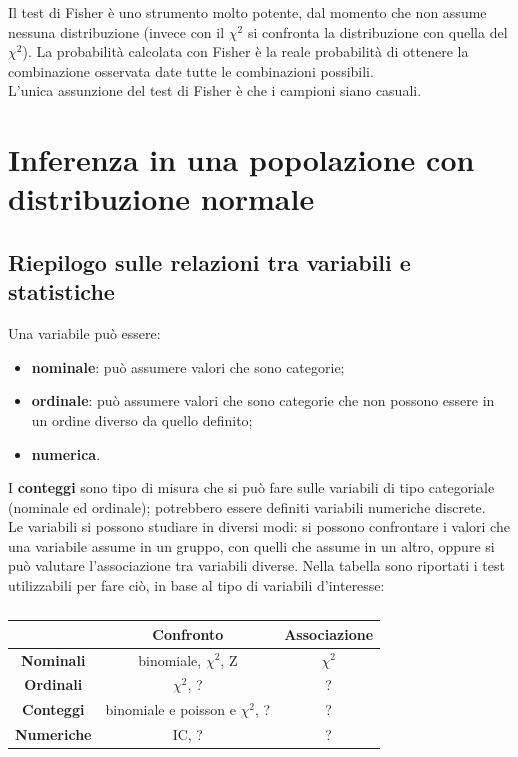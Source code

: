\documentclass[10pt, draft]{book}
\begin{document}
Il test di Fisher è uno strumento molto potente, dal momento che non assume nessuna distribuzione (invece con il $\chi^2$ si confronta la distribuzione con quella del $\chi^2$). La probabilità calcolata con Fisher è la reale probabilità di ottenere la combinazione osservata date tutte le combinazioni possibili.
\\
L'unica assunzione del test di Fisher è che i campioni siano casuali.

\chapter{Inferenza in una popolazione con distribuzione normale}

\section{Riepilogo sulle relazioni tra variabili e statistiche}
Una variabile può essere:
\begin{itemize}
    \item \textbf{nominale}: può assumere valori che sono categorie;
    \item \textbf{ordinale}: può assumere valori che sono categorie che non possono essere in un ordine diverso da quello definito;
    \item \textbf{numerica}.
\end{itemize}
I \textbf{conteggi} sono tipo di misura che si può fare sulle variabili di tipo categoriale (nominale ed ordinale); potrebbero essere definiti variabili numeriche discrete.
\\
Le variabili si possono studiare in diversi modi: si possono confrontare i valori che una variabile assume in un gruppo, con quelli che assume in un altro, oppure si può valutare l'associazione tra variabili diverse.
Nella tabella sono riportati i test utilizzabili per fare ciò, in base al tipo di variabili d'interesse:
\begin{table}[H]
    \centering
    \renewcommand\arraystretch{1.2}
    \begin{tabular}{c|c|c}
    \hline
    & \textbf{Confronto} & \textbf{Associazione}\\
    \hline
    \textbf{Nominali} & binomiale, $\chi^2$, Z & $\chi^2$\\
    \hline
    \textbf{Ordinali} & $\chi^2$, ? & ?\\
    \hline
    \textbf{Conteggi} & binomiale e poisson e $\chi^2$, ? & ?\\
    \hline
    \textbf{Numeriche} & IC, ? & ?\\
    \hline
    \end{tabular}
    \caption{\small{}}
    \label{tabstrumentivariabili}
\end{table}\noindent
\end{document}
